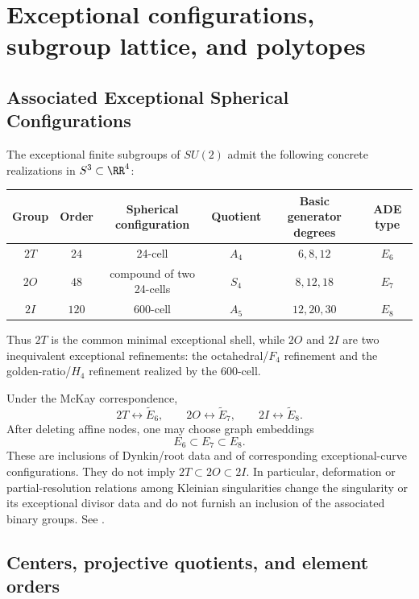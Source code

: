 \documentclass[11pt]{article}
\begin{document}
\section{Exceptional configurations, subgroup lattice, and polytopes}
\subsection{Associated Exceptional Spherical Configurations}

The exceptional finite subgroups of $SU(2)$ admit the following concrete
realizations in $S^3 \subset \RR^4$:

\begin{center}
\begin{tabular}{|c|c|c|c|c|c|}
\hline
Group & Order & Spherical configuration & Quotient & Basic generator degrees & ADE type \\
\hline
\(2T\) & \(24\) & 24-cell & \(A_4\) & \(6,8,12\) & \(E_6\) \\
\(2O\) & \(48\) & compound of two 24-cells & \(S_4\) & \(8,12,18\) & \(E_7\) \\
\(2I\) & \(120\) & 600-cell & \(A_5\) & \(12,20,30\) & \(E_8\) \\
\hline
\end{tabular}
\end{center}

Thus \(2T\) is the common minimal exceptional shell, while \(2O\) and \(2I\) are two inequivalent exceptional refinements: the octahedral/\(F_4\) refinement and the golden-ratio/\(H_4\) refinement realized by the 600-cell.

\begin{remark}
\label{p1:rem:dynkin-not-subgroup}
Under the McKay correspondence,
\[
    2T\longleftrightarrow\widetilde E_6,
    \qquad
    2O\longleftrightarrow\widetilde E_7,
    \qquad
    2I\longleftrightarrow\widetilde E_8.
\]
After deleting affine nodes, one may choose graph embeddings
\[
    E_6\subset E_7\subset E_8.
\]
These are inclusions of Dynkin/root data and of corresponding exceptional-curve
configurations.  They do not imply
\(2T\subset2O\subset2I\).  In particular, deformation or partial-resolution
relations among Kleinian singularities change the singularity or its exceptional
divisor data and do not furnish an inclusion of the associated binary groups.
See \cite{McKay1980,Slodowy1980}.
\end{remark}

\subsection{Centers, projective quotients, and element orders}
\label{p1:sec:exceptional-quotients}
\end{document}
